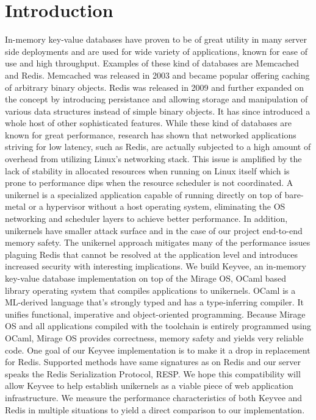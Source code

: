 \documentclass[english,10pt,twocolumn]{article}
\begin{document}
\section{Introduction}
In-memory key-value databases have proven to be of great utility in many server side deployments and are used for wide variety of applications, known for ease of use and high throughput.
Examples of these kind of databases are Memcached and Redis.
Memcached was released in 2003 and became popular offering caching of arbitrary binary objects.
Redis was released in 2009 and further expanded on the concept by introducing persistance and allowing storage and manipulation of various data structures instead of simple binary objects.
It has since introduced a whole host of other sophisticated features.
While these kind of databases are known for great performance, research has shown that networked applications striving for low latency, such as Redis, are actually subjected to a high amount of overhead from utilizing Linux's networking stack.\cite{arrakis}
This issue is amplified by the lack of stability in allocated resources when running on Linux itself which is prone to performance dips when the resource scheduler is not coordinated.
A unikernel is a specialized application capable of running directly on top of bare-metal or a hypervisor without a host operating system, eliminating the OS networking and scheduler layers to achieve better performance.
In addition, unikernels have smaller attack surface and in the case of our project end-to-end memory safety.
The unikernel approach mitigates many of the performance issues plaguing Redis that cannot be resolved at the application level and introduces increased security with interesting implications.
We build Keyvee, an in-memory key-value database implementation on top of the Mirage OS\cite{mirage}, OCaml based library operating system that compiles applications to unikernels.
OCaml is a ML-derived language that's strongly typed and has a type-inferring compiler.
It unifies functional, imperative and object-oriented programming.
Because Mirage OS and all applications compiled with the toolchain is entirely programmed using OCaml, Mirage OS provides correctness, memory safety and yields very reliable code.
One goal of our Keyvee implementation is to make it a drop in replacement for Redis.
Supported methods have same signatures as on Redis and our server speaks the Redis Serialization Protocol\cite{redis-protocol}, RESP.
We hope this compatibility will allow Keyvee to help establish unikernels as a viable piece of web application infrastructure.
We measure the performance characteristics of both Keyvee and Redis in multiple situations to yield a direct comparison to our implementation.
\end{document}
